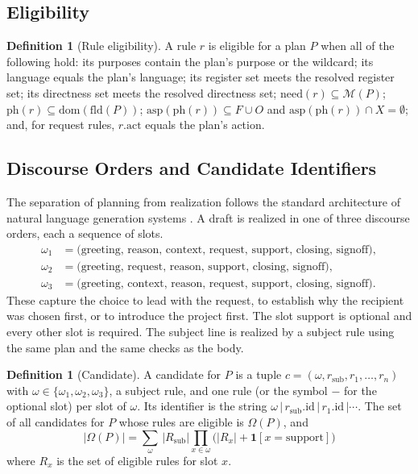 \documentclass[11pt]{article}
\theoremstyle{definition}
\newtheorem{definition}[theorem]{Definition}
\theoremstyle{remark}
\newcommand{\Mset}{\mathcal{M}}
\newcommand{\need}{\mathrm{need}}
\begin{document}
\subsection{Eligibility}

\begin{definition}[Rule eligibility]\label{def:ruleelig}
A rule $r$ is eligible for a plan $P$ when all of the following hold: its purposes contain the plan's purpose or the wildcard; its language equals the plan's language; its register set meets the resolved register set; its directness set meets the resolved directness set; $\need(r)\subseteq\Mset(P)$; $\mathrm{ph}(r)\subseteq\mathrm{dom}(\mathrm{fld}(P))$; $\mathrm{asp}(\mathrm{ph}(r))\subseteq F\cup O$ and $\mathrm{asp}(\mathrm{ph}(r))\cap X=\emptyset$; and, for request rules, $r.\mathrm{act}$ equals the plan's action.
\end{definition}

\subsection{Discourse Orders and Candidate Identifiers}

The separation of planning from realization follows the standard architecture of natural language generation systems \cite{reiterdale2000}. A draft is realized in one of three discourse orders, each a sequence of slots.
\begin{align*}
\omega_{1}&=\text{(greeting, reason, context, request, support, closing, signoff)},\\
\omega_{2}&=\text{(greeting, request, reason, support, closing, signoff)},\\
\omega_{3}&=\text{(greeting, context, reason, request, support, closing, signoff)}.
\end{align*}
These capture the choice to lead with the request, to establish why the recipient was chosen first, or to introduce the project first. The slot $\text{support}$ is optional and every other slot is required. The subject line is realized by a subject rule using the same plan and the same checks as the body.

\begin{definition}[Candidate]\label{def:cand}
A candidate for $P$ is a tuple $c=(\omega,r_{\mathrm{sub}},r_1,\dots,r_n)$ with $\omega\in\{\omega_1,\omega_2,\omega_3\}$, a subject rule, and one rule (or the symbol $-$ for the optional slot) per slot of $\omega$. Its identifier is the string $\omega\,|\,r_{\mathrm{sub}}.\mathrm{id}\,|\,r_1.\mathrm{id}\,|\cdots$. The set of all candidates for $P$ whose rules are eligible is $\Omega(P)$, and
\[
|\Omega(P)|=\sum_{\omega}\,|R_{\mathrm{sub}}|\prod_{x\in\omega}\bigl(|R_x|+\mathbf{1}[x=\text{support}]\bigr)
\]
where $R_x$ is the set of eligible rules for slot $x$.
\end{definition}
\end{document}
